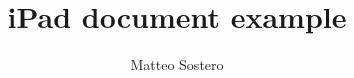 \documentclass[12pt,titlepage]{article}
\author{Matteo Sostero}
\title{iPad document example}
\begin{document}
\maketitle
\clearpage
\tableofcontents
\clearpage

\blindmathpaper
\end{document}
